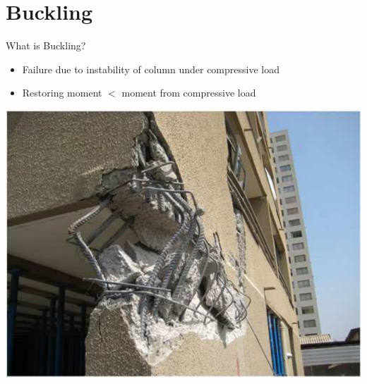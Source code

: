 \documentclass[10pt, svgnames]{beamer}
\begin{document}
\section{Buckling}
\label{sec:org5a47ea1}

\begin{frame}[label={sec:orgf3b8c39}]{What is Buckling?}
\begin{itemize}
\item Failure due to instability of column under compressive load
\item Restoring moment \(<\) moment from compressive load
\end{itemize}

\begin{center}
\includegraphics[width=.9\linewidth]{pictures/buckled-column.pdf}
\end{center}
\end{frame}
\end{document}
